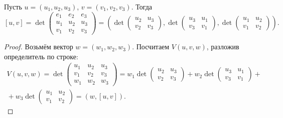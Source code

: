 \begin{statement}
    Пусть $u = (u_1, u_2, u_3)$, $v = (v_1, v_2, v_3)$. Тогда
    $$
    [u, v] = \det\begin{pmatrix}
        e_1 & e_2 & e_3\\
        u_1 & u_2 & u_3\\
        v_1 & v_2 & v_3
    \end{pmatrix} = 
    \left(\det
        \begin{pmatrix}
            u_2 & u_3\\
            v_2 & v_3
        \end{pmatrix},\det
        \begin{pmatrix}
            u_3 & u_1\\
            v_3 & v_1
        \end{pmatrix},\det
        \begin{pmatrix}
            u_1 & u_2\\
            v_1 & v_2
        \end{pmatrix}
    \right).
    $$
\end{statement}

\begin{proof}
    Возьмём вектор $w = (w_1, w_2, w_3)$. Посчитаем $V(u, v, w)$, разложив определитель по строке:
    $$\begin{array}{c}
        V(u, v, w) = \det\begin{pmatrix}
            u_1 & u_2 & u_3\\
            v_1 & v_2 & v_3\\
            w_1 & w_2 & w_3
        \end{pmatrix} = w_1\det
        \begin{pmatrix}
            u_2 & u_3\\
            v_2 & v_3
        \end{pmatrix} + w_2\det
        \begin{pmatrix}
            u_3 & u_1\\
            v_3 & v_1
        \end{pmatrix} + {}\\{} + w_3\det
        \begin{pmatrix}
            u_1 & u_2\\
            v_1 & v_2
        \end{pmatrix} = (w, [u, v]).
    \end{array}
    $$
\end{proof}

